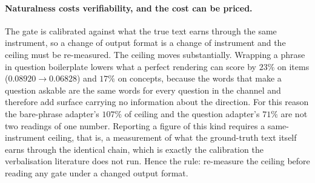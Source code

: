 \documentclass[11pt]{article}
\begin{document}
\paragraph{Naturalness costs verifiability, and the cost can be priced.} The gate is calibrated
against what the true text earns through the same instrument, so a change of output format is a change
of instrument and the ceiling must be re-measured. The ceiling moves substantially. Wrapping a phrase
in question boilerplate lowers what a perfect rendering can score by $23\%$ on items
($0.08920\to0.06828$) and $17\%$ on concepts, because the words that make a question askable are the
same words for every question in the channel and therefore add surface carrying no information about
the direction. For this reason the bare-phrase adapter's $107\%$ of ceiling and the question adapter's
$71\%$ are not two readings of one number. Reporting a figure of this kind requires a same-instrument
ceiling, that is, a measurement of what the ground-truth text itself earns through the identical
chain, which is exactly the calibration the verbalisation literature does not run. Hence the rule:
re-measure the ceiling before reading any gate under a changed output format.
\end{document}
